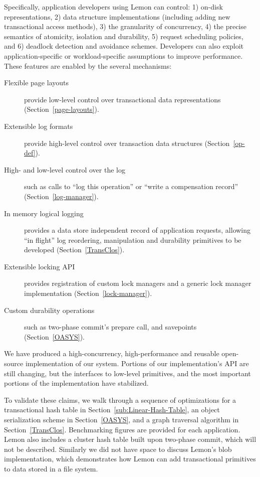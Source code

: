 \documentclass[10pt,letterpaper,twocolumn,english]{article}
\newcommand{\yad}{Lemon\xspace}
\begin{document}
Specifically, application developers using \yad can control: 1)
on-disk representations, 2) data structure implementations (including
adding new transactional access methods), 3) the granularity of
concurrency, 4) the precise semantics of atomicity, isolation and
durability, 5) request scheduling policies, and 6) deadlock detection and avoidance schemes.  Developers
can also exploit application-specific or workload-specific assumptions
to improve performance.
These features are enabled by the several mechanisms:
\begin{description}
\item[Flexible page layouts] provide low-level control over 
      transactional data representations (Section~\ref{page-layouts}).
\item[Extensible log formats] provide high-level control over
      transaction data structures (Section~\ref{op-def}).
\item [High- and low-level control over the log] such as calls to ``log this
      operation'' or ``write a compensation record'' (Section~\ref{log-manager}).
\item [In memory logical logging] provides a data store independent
      record of application requests, allowing ``in flight'' log
      reordering, manipulation and durability primitives to be
      developed (Section~\ref{TransClos}).
\item[Extensible locking API] provides registration of custom lock managers
      and a generic lock manager implementation (Section~\ref{lock-manager}).
\item[Custom durability operations] such as two-phase commit's
      prepare call, and savepoints (Section~\ref{OASYS}).
\end{description}

We have produced a high-concurrency, high-performance and reusable
open-source implementation of our system.  Portions of our
implementation's API are still changing, but the interfaces 
to low-level primitives, and the most important portions of the implementation have stabilized.  

To validate these claims, we walk
through a sequence of optimizations for a transactional hash
table in Section~\ref{sub:Linear-Hash-Table}, an object serialization 
scheme in Section~\ref{OASYS}, and a graph traversal algorithm in 
Section~\ref{TransClos}.  Benchmarking figures are provided for each 
application.  \yad also includes a cluster hash table 
built upon two-phase commit, which will not be described.  Similarly we did not have space to discuss \yad's 
blob implementation, which demonstrates how \yad can
add transactional primitives to data stored in a file system.
\end{document}
